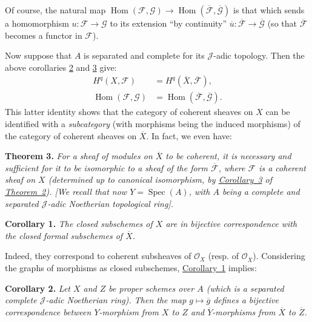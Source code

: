 \documentclass{article}
\newenvironment{itenv}[1]
  {\phantomsection\par\medskip\noindent\textbf{#1.}\itshape}
  {\medskip}
\newcommand{\scr}[1]{{\mathscr{#1}}}
\DeclareMathOperator{\Spec}{Spec}
\DeclareMathOperator{\Hom}{Hom}
\newcommand{\oldpage}[1]{\marginpar{\footnotesize$\Big\vert$ \textit{p.~#1}}}
\begin{document}
Of course, the natural map $\Hom(\scr{F},\scr{G})\to\Hom(\overline{\scr{F}},\overline{\scr{G}})$ is that which sends a homomorphism $u\colon\scr{F}\to\scr{G}$ to its extension ``by continuity'' $\overline{u}\colon\overline{\scr{F}}\to\overline{\scr{G}}$ (so that $\overline{\scr{F}}$ becomes a functor in $\scr{F}$).

Now suppose that $A$ is separated and complete for its $\scr{J}$-adic topology.
Then the above corollaries \hyperref[theorem2corollary2]{2} and \hyperref[theorem2corollary3]{3} give:
\[
  \begin{aligned}
    H^q(X,\scr{F}) &= H^q(\overline{X},\overline{\scr{F}}),
  \\\Hom(\scr{F},\scr{G}) &= \Hom(\overline{\scr{F}},\overline{\scr{G}}).
  \end{aligned}
\]
\oldpage{182-06}
This latter identity shows that the category of coherent sheaves on $X$ can be identified with a \emph{subcategory} (with morphisms being the induced morphisms) of the category of coherent sheaves on $\overline{X}$.
In fact, we even have:

\begin{itenv}{Theorem 3}
\label{theorem3}
  For a sheaf of modules on $\overline{X}$ to be coherent, it is necessary and sufficient for it to be isomorphic to a sheaf of the form $\overline{\scr{F}}$, where $\scr{F}$ is a coherent sheaf on $X$ (determined up to canonical isomorphism, by \hyperref[theorem2corollary3]{Corollary~3} of \hyperref[theorem2]{Theorem~2}).
  [We recall that now $Y=\Spec(A)$, with $A$ being a complete and separated $\scr{J}$-adic Noetherian topological ring].
\end{itenv}

\begin{itenv}{Corollary 1}
\label{theorem3corollary1}
  The closed subschemes of $X$ are in bijective correspondence with the closed formal subschemes of $\overline{X}$.
\end{itenv}

Indeed, they correspond to coherent subsheaves of $\scr{O}_X$ (resp. of $\scr{O}_{\overline{X}}$).
Considering the graphs of morphisms as closed subschemes, \hyperref[theorem3corollary1]{Corollary~1} implies:

\begin{itenv}{Corollary 2}
\label{theorem3corollary2}
  Let $X$ and $Z$ be proper schemes over $A$ (which is a separated complete $\scr{J}$-adic Noetherian ring).
  Then the map $g\mapsto\overline{g}$ defines a bijective correspondence between $Y$-morphism from $X$ to $Z$ and $\overline{Y}$-morphisms from $\overline{X}$ to $\overline{Z}$.
\end{itenv}
\end{document}
